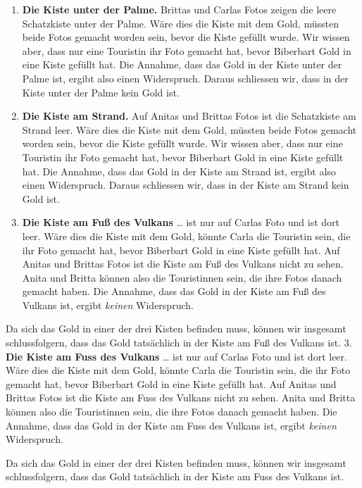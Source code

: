 \documentclass[a4paper,11pt]{report}
\begin{document}
\begin{enumerate}
  \item \textbf{Die Kiste unter der Palme.}
Brittas und Carlas Fotos zeigen die leere Schatzkiste unter der Palme. Wäre dies die Kiste mit dem Gold, müssten beide Fotos gemacht worden sein, bevor die Kiste gefüllt wurde. Wir wissen aber, dass nur eine Touristin ihr Foto gemacht hat, bevor Biberbart Gold in eine Kiste gefüllt hat. Die Annahme, dass das Gold in der Kiste unter der Palme ist, ergibt also einen Widerspruch. Daraus schliessen wir, dass in der Kiste unter der Palme kein Gold ist.
  \item \textbf{Die Kiste am Strand.}
Auf Anitas und Brittas Fotos ist die Schatzkiste am Strand leer. Wäre dies die Kiste mit dem Gold, müssten beide Fotos gemacht worden sein, bevor die Kiste gefüllt wurde. Wir wissen aber, dass nur eine Touristin ihr Foto gemacht hat, bevor Biberbart Gold in eine Kiste gefüllt hat. Die Annahme, dass das Gold in der Kiste am Strand ist, ergibt also einen Widerspruch. Daraus schliessen wir, dass in der Kiste am Strand kein Gold ist.
  \item \textbf{Die Kiste am Fuß des Vulkans}
… ist nur auf Carlas Foto und ist dort leer. Wäre dies die Kiste mit dem Gold, könnte Carla die Touristin sein, die ihr Foto gemacht hat, bevor Biberbart Gold in eine Kiste gefüllt hat. Auf Anitas und Brittas Fotos ist die Kiste am Fuß des Vulkans nicht zu sehen.  Anita und Britta können also die Touristinnen sein, die ihre Fotos danach gemacht haben.  Die Annahme, dass das Gold in der Kiste am Fuß des Vulkans ist, ergibt \emph{keinen} Widerspruch.
\end{enumerate}

Da sich das Gold in einer der drei Kisten befinden muss, können wir insgesamt schlussfolgern, dass das Gold tatsächlich in der Kiste am Fuß des Vulkans ist.
$3$. \textbf{Die Kiste am Fuss des Vulkans}
… ist nur auf Carlas Foto und ist dort leer. Wäre dies die Kiste mit dem Gold, könnte Carla die Touristin sein, die ihr Foto gemacht hat, bevor Biberbart Gold in eine Kiste gefüllt hat. Auf Anitas und Brittas Fotos ist die Kiste am Fuss des Vulkans nicht zu sehen.  Anita und Britta können also die Touristinnen sein, die ihre Fotos danach gemacht haben.  Die Annahme, dass das Gold in der Kiste am Fuss des Vulkans ist, ergibt \emph{keinen} Widerspruch.

Da sich das Gold in einer der drei Kisten befinden muss, können wir insgesamt schlussfolgern, dass das Gold tatsächlich in der Kiste am Fuss des Vulkans ist.
\end{document}
